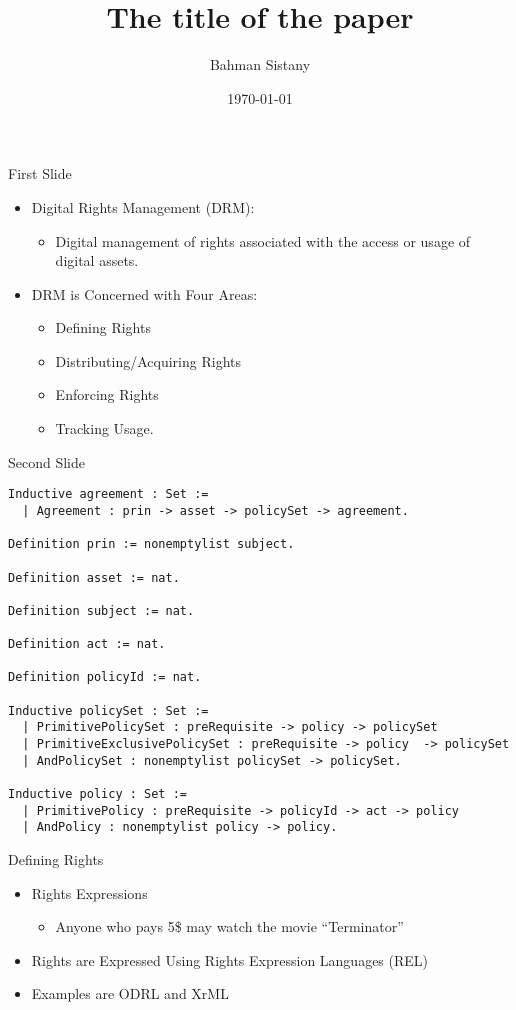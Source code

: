 \documentclass{beamer}
\title{The title of the paper}
\author{Bahman Sistany}
\date{\today}
\begin{document}
\begin{frame}
\titlepage
\end{frame}

\begin{frame}{First Slide}
\begin{itemize}
   \item Digital Rights Management (DRM):
   \begin{itemize}
      \item Digital management of rights associated with the access or usage of digital assets.
   \end{itemize}

   \item DRM is Concerned with Four Areas:
     \begin{itemize}
	\item Defining Rights
	\item Distributing/Acquiring Rights
	\item Enforcing Rights
	\item Tracking Usage.
     \end{itemize}
\end{itemize}
\end{frame}
\begin{frame}[fragile]{Second Slide}
\lstset{language=Coq}
\begin{lstlisting}
Inductive agreement : Set :=
  | Agreement : prin -> asset -> policySet -> agreement.

Definition prin := nonemptylist subject.

Definition asset := nat.

Definition subject := nat.

Definition act := nat.

Definition policyId := nat.

Inductive policySet : Set :=
  | PrimitivePolicySet : preRequisite -> policy -> policySet 
  | PrimitiveExclusivePolicySet : preRequisite -> policy  -> policySet 
  | AndPolicySet : nonemptylist policySet -> policySet.

Inductive policy : Set :=
  | PrimitivePolicy : preRequisite -> policyId -> act -> policy 
  | AndPolicy : nonemptylist policy -> policy.

\end{lstlisting}
\end{frame}
\begin{frame}[fragile]{Defining Rights}
\LARGE
\begin{itemize}
\item Rights Expressions
   \begin{itemize}
   \item Anyone who pays 5\$ may watch the movie ``Terminator''
   \end{itemize}
\item Rights are Expressed Using Rights Expression Languages (REL)
\item Examples are ODRL and XrML
\end{itemize}
\end{frame}
\end{document}
